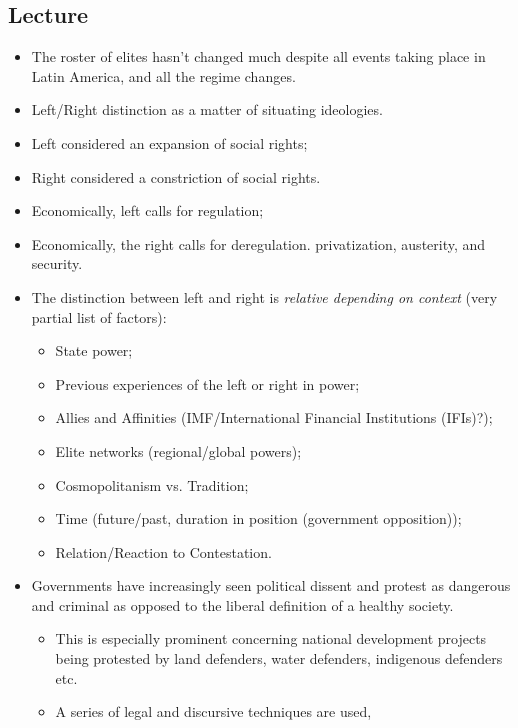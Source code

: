 \documentclass{article}
\begin{document}
    \subsection{Lecture}
    \begin{itemize}
        \item The roster of elites hasn't changed much despite all events
        taking place in Latin America, and all the regime changes.
        \item Left/Right distinction as a matter of situating ideologies.
        \item Left considered an expansion of social rights;
        \item Right considered a constriction of social rights.
        \item Economically, left calls for regulation;
        \item Economically, the right calls for deregulation.
        privatization, austerity, and security.
        \item The distinction between left and right is
        \textit{relative depending on context} (very partial list of factors):
        \begin{itemize}
            \item State power;
            \item Previous experiences of the left or right in power;
            \item Allies and Affinities (IMF/International Financial
            Institutions (IFIs)?);
            \item Elite networks (regional/global powers);
            \item Cosmopolitanism vs. Tradition;
            \item Time (future/past, duration in position (government
            opposition));
            \item Relation/Reaction to Contestation.
        \end{itemize}
        \item Governments have increasingly seen political dissent and
        protest as dangerous and criminal as opposed to the liberal
        definition of a healthy society.
        \begin{itemize}
            \item This is especially prominent concerning national
            development projects being protested by land defenders, water
            defenders, indigenous defenders etc.
            \item A series of legal and discursive techniques are used,

\end{itemize}
\end{itemize}
\end{document}
